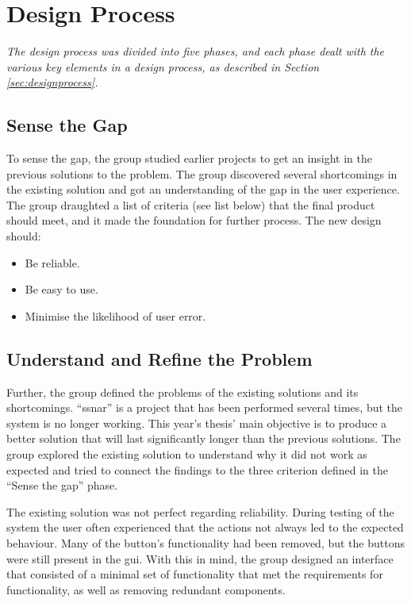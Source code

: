 \section{Design Process}
\label{secr:designproc}
\textit{The design process was divided into five phases, and each phase dealt with the various key elements in a design process, as described in Section \ref{sec:designprocess}.}

\subsection{Sense the Gap}
\label{sec:sensethegap}
To sense the gap, the group studied earlier projects to get an insight in the previous solutions to the problem. The group discovered several shortcomings in the existing solution and got an understanding of the gap in the user experience. The group draughted a list of criteria (see list below) that the final product should meet, and it made the foundation for further process. The new design should:

\begin{itemize}
    \item Be reliable.
    \item Be easy to use.
    \item Minimise the likelihood of user error.
\end{itemize}

\subsection{Understand and Refine the Problem}
\label{sec:understprob}
Further, the group defined the problems of the existing solutions and its shortcomings. ``\acrlong{ssnar}'' is a project that has been performed several times, but the system is no longer working. This year's thesis' main objective is to produce a better solution that will last significantly longer than the previous solutions. The group explored the existing solution to understand why it did not work as expected and tried to connect the findings to the three criterion defined in the ``Sense the gap'' phase.

The existing solution was not perfect regarding reliability. During testing of the system the user often experienced that the actions not always led to the expected behaviour. Many of the button's functionality had been removed, but the buttons were still present in the \acrshort{gui}. With this in mind, the group designed an interface that consisted of a minimal set of functionality that met the requirements for functionality, as well as removing redundant components.


